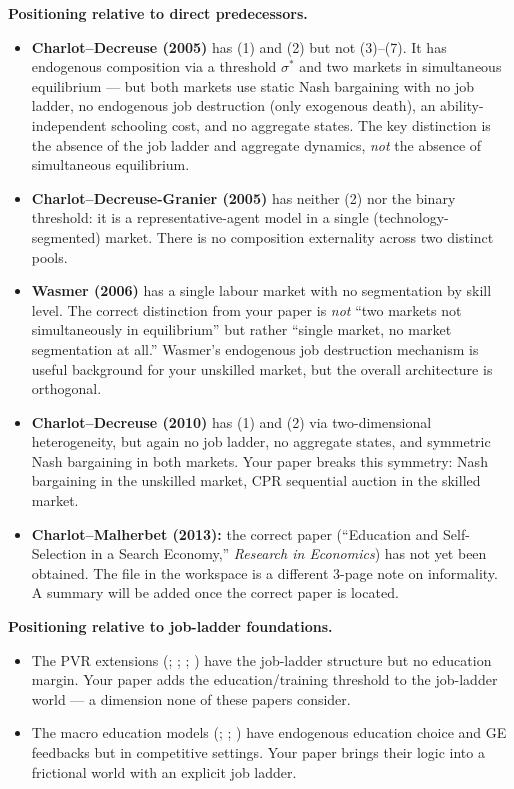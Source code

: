 \documentclass[12pt]{article}
\begin{document}
\medskip

\textbf{Positioning relative to direct predecessors.}

\begin{itemize}
    \item \textbf{Charlot--Decreuse (2005)} has (1) and (2) but not (3)--(7). It has endogenous composition via a threshold $\sigma^*$ and two markets in simultaneous equilibrium --- but both markets use static Nash bargaining with no job ladder, no endogenous job destruction (only exogenous death), an ability-independent schooling cost, and no aggregate states. The key distinction is the absence of the job ladder and aggregate dynamics, \emph{not} the absence of simultaneous equilibrium.

    \item \textbf{Charlot--Decreuse-Granier (2005)} has neither (2) nor the binary threshold: it is a representative-agent model in a single (technology-segmented) market. There is no composition externality across two distinct pools.

    \item \textbf{Wasmer (2006)} has a single labour market with no segmentation by skill level. The correct distinction from your paper is \emph{not} ``two markets not simultaneously in equilibrium'' but rather ``single market, no market segmentation at all.'' Wasmer's endogenous job destruction mechanism is useful background for your unskilled market, but the overall architecture is orthogonal.

    \item \textbf{Charlot--Decreuse (2010)} has (1) and (2) via two-dimensional heterogeneity, but again no job ladder, no aggregate states, and symmetric Nash bargaining in both markets. Your paper breaks this symmetry: Nash bargaining in the unskilled market, CPR sequential auction in the skilled market.

    \item \textbf{Charlot--Malherbet (2013):} the correct paper (``Education and Self-Selection in a Search Economy,'' \emph{Research in Economics}) has not yet been obtained. The file in the workspace is a different 3-page note on informality. A summary will be added once the correct paper is located.
\end{itemize}

\medskip

\textbf{Positioning relative to job-ladder foundations.}

\begin{itemize}
    \item The PVR extensions (\citet{lise2017}; \citet{bagger2014}; \citet{robin2011}; \citet{moscarini2024}) have the job-ladder structure but no education margin. Your paper adds the education/training threshold to the job-ladder world --- a dimension none of these papers consider.
    \item The macro education models (\citet{barany2016}; \citet{abbott2019}; \citet{lee2019}) have endogenous education choice and GE feedbacks but in competitive settings. Your paper brings their logic into a frictional world with an explicit job ladder.
\end{itemize}
\end{document}
